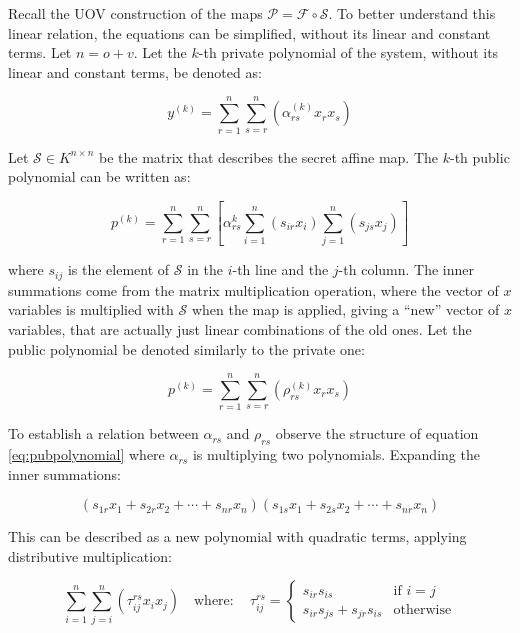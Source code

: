\documentclass{ufsctex/ufsctex}
\begin{document}
Recall the UOV construction of the maps $\mathcal{P} = \mathcal{F} \circ
\mathcal{S}$. To better understand this linear relation, the equations can be
simplified, without its linear and constant terms. Let $n = o + v$. Let the
$k$-th private polynomial of the system, without its linear and constant terms,
be denoted as:

\begin{equation}
y^{(k)} = \sum_{r=1}^n \sum_{s=r}^n\left(\alpha^{(k)}_{rs}x_rx_s\right)
\end{equation}

Let $\mathcal{S} \in K^{n \times n}$ be the matrix that describes the secret
affine map. The $k$-th public polynomial can be written as:

\begin{equation}\label{eq:pubpolynomial}
p^{(k)} = \sum_{r=1}^n \sum_{s=r}^n
\left[ \alpha^{k}_{rs} \sum_{i=1}^n(s_{ir}x_i) \sum_{j=1}^n(s_{js}x_j) \right]
\end{equation}

where $s_{ij}$ is the element of $\mathcal{S}$ in the $i$-th line and the
$j$-th column. The inner summations come from the matrix multiplication
operation, where the vector of $x$ variables is multiplied with $\mathcal{S}$
when the map is applied, giving a ``new'' vector of $x$ variables, that are
actually just linear combinations of the old ones. Let the public polynomial be
denoted similarly to the private one:

\begin{equation}
p^{(k)} = \sum_{r=1}^n \sum_{s=r}^n \left( \rho^{(k)}_{rs}x_rx_s \right)
\end{equation}

To establish a relation between $\alpha_{rs}$ and $\rho_{rs}$
observe the structure of equation \ref{eq:pubpolynomial} where $\alpha_{rs}$ is
multiplying two polynomials. Expanding the inner summations:

\begin{equation}
(s_{1r}x_1 + s_{2r}x_2 + \cdots + s_{nr}x_n)
(s_{1s}x_1 + s_{2s}x_2 + \cdots + s_{nr}x_n)
\end{equation}

This can be described as a new polynomial with quadratic terms, applying
distributive multiplication:

\begin{equation}\label{eq:tau}
\sum_{i=1}^{n}\sum_{j=i}^n \left( \tau^{rs}_{ij} x_i x_j \right)
\quad \mathrm{where:} \quad \tau^{rs}_{ij} =
\begin{cases}
	s_{ir} s_{is} &\mbox{if } i=j \\
	s_{ir} s_{js} + s_{jr} s_{is} &\mbox{otherwise}
\end{cases}
\end{equation}
\end{document}
